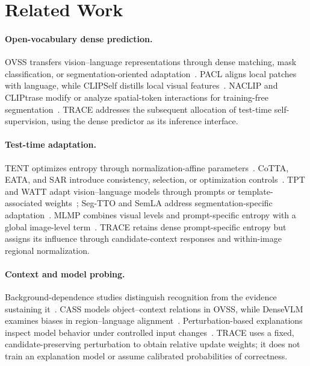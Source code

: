 \documentclass[letterpaper]{article}
\begin{document}
\section{Related Work}
\paragraph{Open-vocabulary dense prediction.}
OVSS transfers vision--language representations through dense matching, mask classification, or segmentation-oriented adaptation~\cite{ghiasi2022openseg,liang2023ovseg,cho2024catseg}. PACL aligns local patches with language, while CLIPSelf distills local visual features~\cite{mukhoti2023pacl,wu2024clipself}. NACLIP and CLIPtrase modify or analyze spatial-token interactions for training-free segmentation~\cite{hajimiri2025naclip,shao2024cliptrase}. TRACE addresses the subsequent allocation of test-time self-supervision, using the dense predictor as its inference interface.

\paragraph{Test-time adaptation.}
TENT optimizes entropy through normalization-affine parameters~\cite{wang2021tent}. CoTTA, EATA, and SAR introduce consistency, selection, or optimization controls~\cite{wang2022cotta,niu2022eata,niu2023sar}. TPT and WATT adapt vision--language models through prompts or template-associated weights~\cite{shu2022tpt,osowiechi2024watt}; Seg-TTO and SemLA address segmentation-specific adaptation~\cite{desilva2025segtto,qorbani2025semla}. MLMP combines visual levels and prompt-specific entropy with a global image-level term~\cite{noori2025mlmp}. TRACE retains dense prompt-specific entropy but assigns its influence through candidate-context responses and within-image regional normalization.

\paragraph{Context and model probing.}
Background-dependence studies distinguish recognition from the evidence sustaining it~\cite{xiao2021backgrounds}. CASS models object--context relations in OVSS, while DenseVLM examines biases in region--language alignment~\cite{kim2025cass,li2025densevlm}. Perturbation-based explanations inspect model behavior under controlled input changes~\cite{fong2019extremal,zhang2020conta}. TRACE uses a fixed, candidate-preserving perturbation to obtain relative update weights; it does not train an explanation model or assume calibrated probabilities of correctness.
\end{document}
